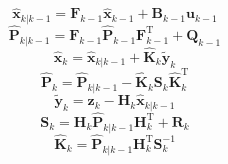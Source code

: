 \documentclass[10pt,a4paper,oneside]{beamer}
\begin{document}
\begin{frame}
	\begin{equation}
	\hat{\textbf{x}}_{k|k-1} = \textbf{F}_{k-1}\hat{\textbf{x}}_{k-1} + \textbf{B}_{k-1}\textbf{u}_{k-1}
	\end{equation}
	\begin{equation}
	\hat{\textbf{P}}_{k|k-1} =  \textbf{F}_{k-1} \hat{\textbf{P}}_{k-1} \textbf{F}_{k-1}^{\text{T}} + \textbf{Q}_{k-1} 
	\end{equation}
	\begin{equation}
	\hat{\textbf{x}}_{k} = \hat{\textbf{x}}_{k|k-1} + \hat{\textbf{K}}_k\tilde{\textbf{y}}_k
	\end{equation}
	\begin{equation}
	\hat{\textbf{P}}_{k} = \hat{\textbf{P}}_{k|k-1} - \hat{\textbf{K}}_k \textbf{S}_k \hat{\textbf{K}}_k^\text{T}
	\end{equation}
	\begin{equation}
	\tilde{\textbf{y}}_k = \textbf{z}_k - \textbf{H}_k\hat{\textbf{x}}_{k|k-1}
	\end{equation}
	\begin{equation}
	\textbf{S}_k = \textbf{H}_k \hat{\textbf{P}}_{k|k-1} \textbf{H}_k^\text{T} + \textbf{R}_k
	\end{equation}
	\begin{equation}
	\hat{\textbf{K}}_k = \hat{\textbf{P}}_{k|k-1}\textbf{H}_k^\text{T}\textbf{S}_k^{-1}
	\end{equation}
	\cite{Ribeiro2004}
	\cite{DeSchutter99}
	\cite{Winkler04}
	\cite{Welch01}
	\cite{Doug07}
	\cite{Stoytchev07}
	\cite{Walchko02}
	\cite{Fletcher10}
	\cite{AM08}
	\cite{wiki-kal} \cite{wiki-kal2} \cite{wiki-inert} \cite{Czerniak12} \cite{Muk12} \cite{TS12} \cite{Esme12} \cite{U12} \cite{Simon12}

\end{frame}
\end{document}
